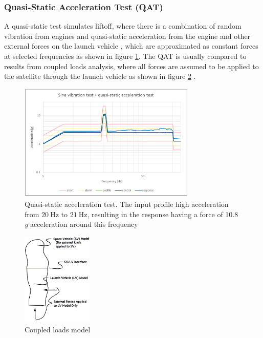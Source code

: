 \documentclass{report}
\begin{document}
\subsubsection{Quasi-Static Acceleration Test (QAT)}
A quasi-static test simulates liftoff, where there is a combination of random vibration from engines and quasi-static acceleration from the engine and other external forces on the launch vehicle \cite{nieto2019cubesat,brown_elements_2002}, which are approximated as constant forces at selected frequencies as shown in figure \ref{fig:qatforces}. The QAT is usually compared to results from coupled loads analysis, where all forces are assumed to be applied to the satellite through the launch vehicle as shown in figure \ref{fig:cla} \cite{dickens2001coupled}.

\begin{figure}[H]
  \centering
  \includegraphics[width=0.75\textwidth]{images/qat.png}
  \caption{Quasi-static acceleration test. The input profile high acceleration from $\SI{20}{\hertz}$ to $\SI{21}{\hertz}$, resulting in the response having a force of 10.8 \textit{g} acceleration around this frequency \cite{nieto2019cubesat}}
  \label{fig:qatforces}
\end{figure}

\begin{figure}[H]
  \centering
  \includegraphics[width=0.3\textwidth]{images/cla.png}
  \caption{Coupled loads model \cite{dickens2001coupled}}
  \label{fig:cla}
\end{figure}
\end{document}

